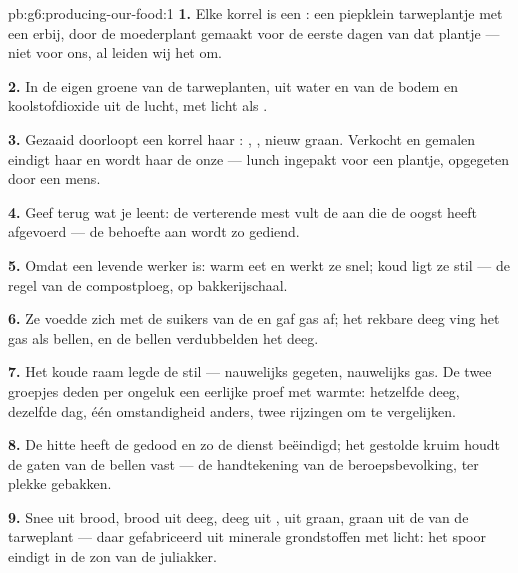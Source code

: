 \begin{solution}{pb:g6:producing-our-food:1}
\textbf{1.} Elke korrel is een : een piepklein tarweplantje met een
 erbij, door de moederplant gemaakt voor de eerste dagen
van dat plantje --- niet voor ons, al leiden wij het om.

\textbf{2.} In de eigen groene  van de tarweplanten, uit water en
 van de bodem en koolstofdioxide uit de lucht, met licht
als .

\textbf{3.} Gezaaid doorloopt een korrel haar : ,
, nieuw graan. Verkocht en gemalen eindigt haar  en
wordt haar  de onze --- lunch ingepakt voor een plantje,
opgegeten door een mens.

\textbf{4.} Geef terug wat je leent: de verterende mest vult de  aan die de oogst heeft afgevoerd --- de behoefte aan  wordt zo gediend.

\textbf{5.} Omdat  een levende werker is: warm eet en werkt ze snel;
koud ligt ze stil --- de regel van de compostploeg, op bakkerijschaal.

\textbf{6.} Ze voedde zich met de suikers van de  en gaf gas af; het
rekbare deeg ving het gas als bellen, en de bellen verdubbelden het deeg.

\textbf{7.} Het koude raam legde de  stil --- nauwelijks gegeten,
nauwelijks gas. De twee groepjes deden per ongeluk een eerlijke proef met
warmte: hetzelfde deeg, dezelfde dag, één omstandigheid anders, twee
rijzingen om te vergelijken.

\textbf{8.} De hitte heeft de  gedood en zo de dienst beëindigd; het
gestolde kruim houdt de gaten van de bellen vast --- de handtekening van
de beroepsbevolking, ter plekke gebakken.

\textbf{9.} Snee uit brood, brood uit deeg, deeg uit ,  uit
graan, graan uit de  van de tarweplant --- daar gefabriceerd uit
minerale grondstoffen met licht: het spoor eindigt in de zon van de
juliakker.


\end{solution}
